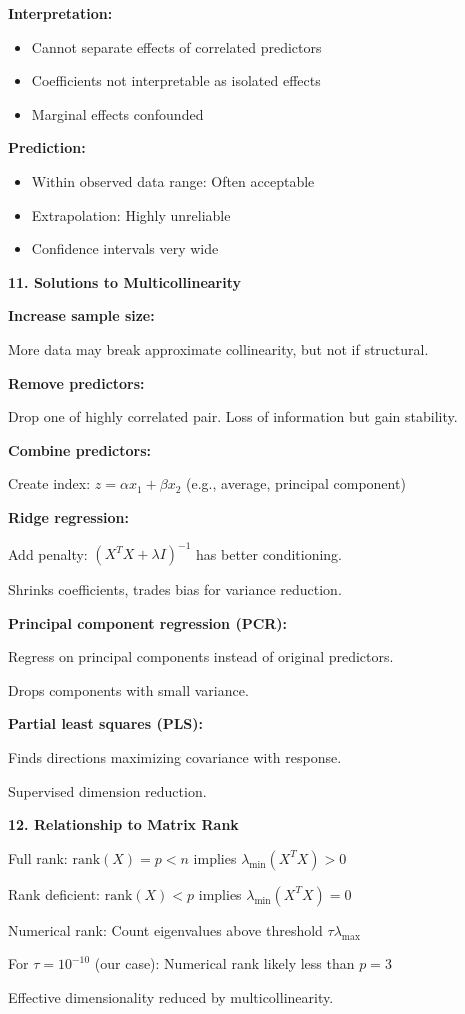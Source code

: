 \documentclass[12pt]{article}
\begin{document}
\begin{explanation}
\textbf{Interpretation:}
\begin{itemize}
\item Cannot separate effects of correlated predictors
\item Coefficients not interpretable as isolated effects
\item Marginal effects confounded
\end{itemize}

\textbf{Prediction:}
\begin{itemize}
\item Within observed data range: Often acceptable
\item Extrapolation: Highly unreliable
\item Confidence intervals very wide
\end{itemize}

\textbf{11. Solutions to Multicollinearity}

\textbf{Increase sample size:}

More data may break approximate collinearity, but not if structural.

\textbf{Remove predictors:}

Drop one of highly correlated pair. Loss of information but gain stability.

\textbf{Combine predictors:}

Create index: $z = \alpha x_1 + \beta x_2$ (e.g., average, principal component)

\textbf{Ridge regression:}

Add penalty: $(X^TX + \lambda I)^{-1}$ has better conditioning.

Shrinks coefficients, trades bias for variance reduction.

\textbf{Principal component regression (PCR):}

Regress on principal components instead of original predictors.

Drops components with small variance.

\textbf{Partial least squares (PLS):}

Finds directions maximizing covariance with response.

Supervised dimension reduction.

\textbf{12. Relationship to Matrix Rank}

Full rank: $\text{rank}(X) = p < n$ implies $\lambda_{\min}(X^TX) > 0$

Rank deficient: $\text{rank}(X) < p$ implies $\lambda_{\min}(X^TX) = 0$

Numerical rank: Count eigenvalues above threshold $\tau \lambda_{\max}$

For $\tau = 10^{-10}$ (our case): Numerical rank likely less than $p = 3$

Effective dimensionality reduced by multicollinearity.

\end{explanation}
\end{document}
